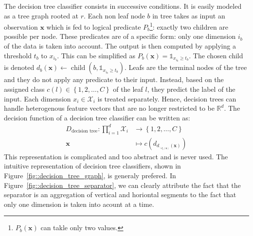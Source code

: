         The decision tree classifier consists in successive conditions.
        It is easily modeled as a tree graph rooted at $r$.
        Each non leaf node $b$ in tree takes as input an observation $\bm{x}$ which is fed to logical predicate $P_b$\footnote{$P_b(\bm{x})$ can takle only two values.}: exactly two children are possible per node.
        These predicates are of a specific form: only one dimension $i_b$ of the data is taken into account.
        The output is then computed by applying a threshold $t_b$ to $x_{i_b}$.
        This can be simplified as $P_b(\bm{x}) = \mathbb{1}_{x_{i_b} \geq t_b} $.
        The chosen child is denoted $d_b(\bm{x}) \leftarrow \operatorname{child}(b, \mathbb{1}_{x_{i_b} \geq t_b})$.
        Leafs are the terminal nodes of the tree and they do not apply any predicate to their input.
        Instead, based on the assigned class $c(l) \in \left\{1, 2, \dots, C\right\}$ of the leaf $l$, they predict the label of the input.
        Each dimension $x_i \in \mathscr{X}_i$ is treated separately.
        Hence, decision trees can handle heterogenous feature vectors that are no longer restricted to be $\mathbb{R}^d$.
        The decision function of a decision tree classifier can be written as:
        \begin{equation}
            \label{eq::df_decision_tree}
            \begin{aligned}
                D_{\text{decision tree}}: \prod_{i=1}^{d}\mathscr{X}_i &\rightarrow \left\{1, 2, \dots, C\right\}\\
                \bm{x} &\mapsto c\left(d_{d_{\ddots_{d_r(\bm{x})}}(\bm{x})}\right)
            \end{aligned}
        \end{equation}
        This representation is complicated and too abstract and is never used.
        The intuitive representation of decision tree classifiers, shown in Figure~\ref{fig::decision_tree_graph}, is generaly prefered.
        In Figure~\ref{fig::decision_tree_separator}, we can clearly attribute the fact that the separator is an aggregation of vertical and horiontal segments to the fact that only one dimension is taken into acount at a time.\\

